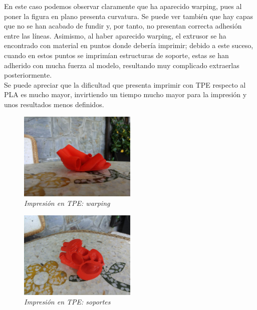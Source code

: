 \documentclass[a4paper,12pt]{article}
\begin{document}
En este caso podemos observar claramente que ha aparecido warping, pues al poner la figura en plano presenta curvatura. Se puede ver también que hay capas que no se han acabado de fundir y, por tanto, no presentan correcta adhesión entre las líneas. Asimismo, al haber aparecido warping, el extrusor se ha encontrado con material en puntos donde debería imprimir; debido a este suceso, cuando en estos puntos se imprimían estructuras de soporte, estas se han adherido con mucha fuerza al modelo, resultando muy complicado extraerlas posteriormente.\\

Se puede apreciar que la dificultad que presenta imprimir con TPE respecto al PLA es mucho mayor, invirtiendo un tiempo mucho mayor para la impresión y unos resultados menos definidos.

	\begin{figure}[!ht]
	\begin{center}
	  \includegraphics[width=0.5\textwidth]{Figuras/heart1-1.jpg}
	  \caption{\emph{Impresi\'{o}n en TPE: warping}}
	\end{center}
	\label{heartTPE1}
	\end{figure}

	\begin{figure}[!ht]
	\begin{center}
	  \includegraphics[width=0.5\textwidth]{Figuras/heart1-2.jpg}
	  \caption{\emph{Impresi\'{o}n en TPE: soportes}}
	\end{center}
	\label{heartTPE2}
	\end{figure}
\end{document}
